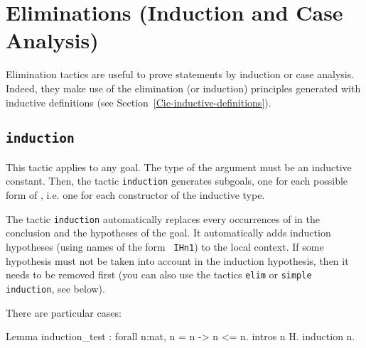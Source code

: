 \section[Eliminations (Induction and Case Analysis)]{Eliminations (Induction and Case Analysis)\label{Tac-induction}}
Elimination tactics are useful to prove statements by induction or
case analysis.  Indeed, they make use of the elimination (or
induction) principles generated with inductive definitions (see
Section~\ref{Cic-inductive-definitions}).

\subsection{\tt induction \term
{}}

This tactic applies to any goal. The type of the argument {\term} must
be an inductive constant. Then, the tactic {\tt induction}
generates subgoals, one for each possible form of {\term}, i.e. one
for each constructor of the inductive type.

The tactic {\tt induction} automatically replaces every occurrences
of {\term} in the conclusion and the hypotheses of the goal.  It
automatically adds induction hypotheses (using names of the form {\tt
  IHn1}) to the local context. If some hypothesis must not be taken
into account in the induction hypothesis, then it needs to be removed
first (you can also use the tactics {\tt elim} or {\tt simple induction},
see below).

There are particular cases:


\Example

\begin{coq_example}
Lemma induction_test : forall n:nat, n = n -> n <= n.
intros n H.
induction n.
\end{coq_example}

